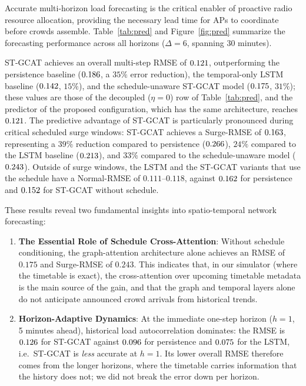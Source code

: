 Accurate multi-horizon load forecasting is the critical enabler of proactive radio resource allocation, providing the necessary lead time for APs to coordinate before crowds assemble. Table~\ref{tab:pred} and Figure~\ref{fig:pred} summarize the forecasting performance across all horizons ($\Delta=6$, spanning 30 minutes).

ST-GCAT achieves an overall multi-step RMSE of $0.121$, outperforming the persistence baseline ($0.186$, a $35\%$ error reduction), the temporal-only LSTM baseline ($0.142$, $15\%$), and the schedule-unaware ST-GCAT model ($0.175$, $31\%$); these values are those of the decoupled ($\eta=0$) row of Table~\ref{tab:pred}, and the predictor of the proposed configuration, which has the same architecture, reaches $0.121$. The predictive advantage of ST-GCAT is particularly pronounced during critical scheduled surge windows: ST-GCAT achieves a Surge-RMSE of $0.163$, representing a $39\%$ reduction compared to persistence ($0.266$), $24\%$ compared to the LSTM baseline ($0.213$), and $33\%$ compared to the schedule-unaware model ($0.243$). Outside of surge windows, the LSTM and the ST-GCAT variants that use the schedule have a Normal-RMSE of $0.111$--$0.118$, against $0.162$ for persistence and $0.152$ for ST-GCAT without schedule.

These results reveal two fundamental insights into spatio-temporal network forecasting:
\begin{enumerate}
  \item \textbf{The Essential Role of Schedule Cross-Attention}: Without schedule conditioning, the graph-attention architecture alone achieves an RMSE of $0.175$ and Surge-RMSE of $0.243$. This indicates that, in our simulator (where the timetable is exact), the cross-attention over upcoming timetable metadata is the main source of the gain, and that the graph and temporal layers alone do not anticipate announced crowd arrivals from historical trends.
  \item \textbf{Horizon-Adaptive Dynamics}: At the immediate one-step horizon ($h=1$, 5 minutes ahead), historical load autocorrelation dominates: the RMSE is $0.126$ for ST-GCAT against $0.096$ for persistence and $0.075$ for the LSTM, i.e.\ ST-GCAT is \emph{less} accurate at $h=1$. Its lower overall RMSE therefore comes from the longer horizons, where the timetable carries information that the history does not; we did not break the error down per horizon.
\end{enumerate}
